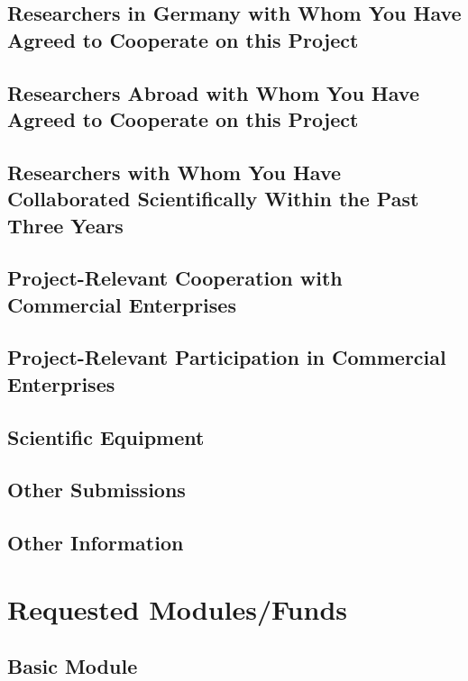\documentclass[de]{dfg-proposal}
\begin{document}
\subsection{Researchers in Germany with Whom You Have Agreed to Cooperate on this Project}

\subsection{Researchers Abroad with Whom You Have Agreed to Cooperate on this Project}

\subsection{Researchers with Whom You Have Collaborated Scientifically Within the Past Three Years}

\subsection{Project-Relevant Cooperation with Commercial Enterprises}

\subsection{Project-Relevant Participation in Commercial Enterprises}

\subsection{Scientific Equipment}

\subsection{Other Submissions}

\subsection{Other Information}

\pagebreak

\section{Requested Modules/Funds}\label{sec:requested-modules-funds}

\subsection{Basic Module}
\end{document}

